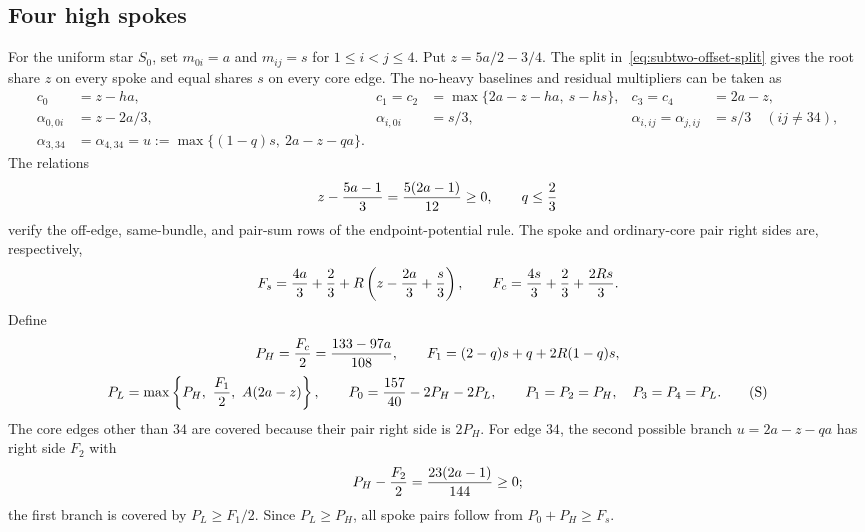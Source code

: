 \documentclass[11pt]{article}
\theoremstyle{definition}\newtheorem{algorithm}{Algorithm}[section]
\numberwithin{equation}{section}
\theoremstyle{remark}\newtheorem*{remark}{Remark}
\begin{document}
\subsection{Four high spokes}\label{app:subtwo-four-high}
For the uniform star $S_0$, set $m_{0i}=a$ and
$m_{ij}=s$ for $1\le i<j\le4$. Put $z=5a/2-3/4$.
The split in~\eqref{eq:subtwo-offset-split} gives the root share $z$
on every spoke and equal shares $s$ on every core edge.
The no-heavy baselines and residual multipliers can be taken as
\[
\begin{aligned}
 c_0&=z-ha,&
 c_1=c_2&=\max\{2a-z-ha,\ s-hs\},&
 c_3=c_4&=2a-z,\\
 \alpha_{0,0i}&=z-2a/3,&
 \alpha_{i,0i}&=s/3,&
 \alpha_{i,ij}=\alpha_{j,ij}&=s/3\quad(ij\ne34),\\
 \alpha_{3,34}&=\alpha_{4,34}
   =u:=\max\{(1-q)s,\ 2a-z-qa\}.
\end{aligned}
\]
The relations
\[
 z-{5a-1\over3}={5(2a-1)\over12}\ge0,\qquad q\le{2\over3}
\]
verify the off-edge, same-bundle, and pair-sum rows of the
endpoint-potential rule. The spoke and ordinary-core pair right sides
are, respectively,
\[
 F_s={4a\over3}+{2\over3}
          +R\left(z-{2a\over3}+{s\over3}\right),
 \qquad
 F_c={4s\over3}+{2\over3}+{2Rs\over3}.
\]
Define
\[
 P_H={F_c\over2}={133-97a\over108},\qquad
 F_1=(2-q)s+q+2R(1-q)s,
\]
\[
 P_L=\max\left\{P_H,\ {F_1\over2},\ A(2a-z)\right\},
 \qquad
 P_0={157\over40}-2P_H-2P_L,\qquad
 P_1=P_2=P_H,\quad P_3=P_4=P_L.                         \tag{S}
\]
The core edges other than $34$ are covered because their pair right
side is $2P_H$. For edge $34$, the second possible branch
$u=2a-z-qa$ has right side $F_2$ with
\[
                    P_H-{F_2\over2}
                         ={23(2a-1)\over144}\ge0;
\]
the first branch is covered by $P_L\ge F_1/2$.
Since $P_L\ge P_H$, all spoke pairs follow from
$P_0+P_H\ge F_s$.
\end{document}
